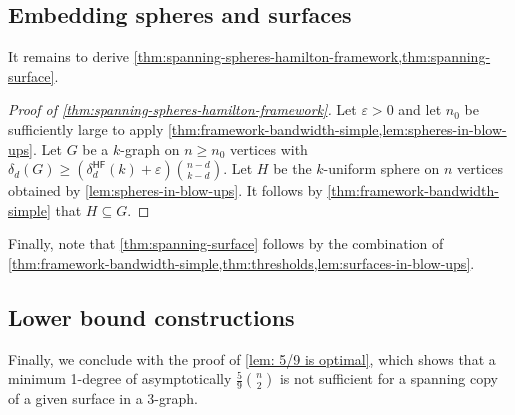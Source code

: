 \documentclass[12pt,reqno]{amsart}
\theoremstyle{plain}
\theoremstyle{definition}
\numberwithin{equation}{section}
\newcommand{\eps}{\varepsilon}
\renewcommand{\subset}{\subseteq}
\DeclareMathOperator{\hf}{\mathsf{HF}}
\begin{document}
    
	
	\subsection{Embedding spheres and surfaces} \label{sec:proofs-main-results-surfaces-spheres}
	
	It remains to derive \cref{thm:spanning-spheres-hamilton-framework,thm:spanning-surface}.
	
	\begin{proof}[Proof of \cref{thm:spanning-spheres-hamilton-framework}]
		Let $\eps>0$ and let $n_0$ be sufficiently large to apply \cref{thm:framework-bandwidth-simple,lem:spheres-in-blow-ups}.
		Let $G$ be a $k$-graph on $n \geq n_0$ vertices with $\delta_d(G) \geq (\delta_d^{\hf}(k) + \eps ) \binom{n-d}{k-d}$.
		Let $H$ be the $k$-uniform sphere on $n$ vertices obtained by \cref{lem:spheres-in-blow-ups}.
		It follows by \cref{thm:framework-bandwidth-simple} that $H \subset G$.
	\end{proof}
	
	Finally, note that \cref{thm:spanning-surface} follows by the combination of \cref{thm:framework-bandwidth-simple,thm:thresholds,lem:surfaces-in-blow-ups}.


    
	
	\subsection{Lower bound constructions}\label{sec:constructions}
	
	Finally, we conclude with the proof of \cref{lem: 5/9 is optimal}, which shows that a minimum 1-degree of asymptotically $\frac{5}{9}\binom{n}{2}$ is not sufficient for a spanning copy of a given surface in a $3$-graph.
	
\end{document}
